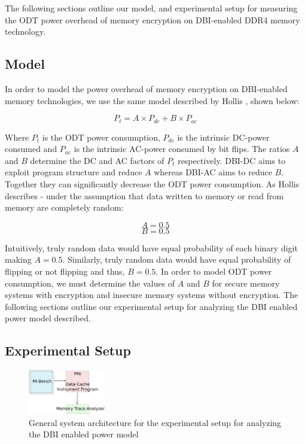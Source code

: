The following sections outline our model, and experimental setup for measuring
the ODT power overhead of memory encryption on DBI-enabled DDR4 memory
technology.

\subsection{Model}
In order to model the power overhead of memory encryption on DBI-enabled memory
technologies, we use the same model described by Hollis \cite{hollis}, shown
below:

    $$ P_t = A \times P_{dc} + B \times P_{ac}$$

Where $P_t$ is the ODT power consumption, $P_{dc}$ is the intrinsic DC-power
consumed and $P_{ac}$ is the intrinsic AC-power consumed by bit flips. The
ratios $A$ and $B$ determine the DC and AC factors of $P_t$ respectively.
DBI-DC aims to exploit program structure and reduce $A$ whereas DBI-AC aims to
reduce $B$. Together they can significantly decrease the ODT power consumption.
As Hollis \cite{hollis} describes - under the assumption that data written to
memory or read from memory are completely random:

  $$ A = 0.5$$
  $$ B = 0.5$$

Intuitively, truly random data would have equal probability of each binary
digit making $A = 0.5$. Similarly, truly random data would have equal
probability of flipping or not flipping and thus, $B = 0.5$. In order to model
ODT power consumption, we must determine the values of $A$ and $B$ for secure
memory systems with encryption and insecure memory systems without encryption.
The following sections outline our experimental setup for analyzing the DBI
enabled power model described.

\subsection{Experimental Setup}

\begin{figure}[!htb]
  \centering
  \includegraphics[width=0.3\textwidth]{figs/exp-design}
  \caption{General system architecture for the experimental setup for analyzing
  the DBI enabled power model}
  \label{fig:exp}
\end{figure}

